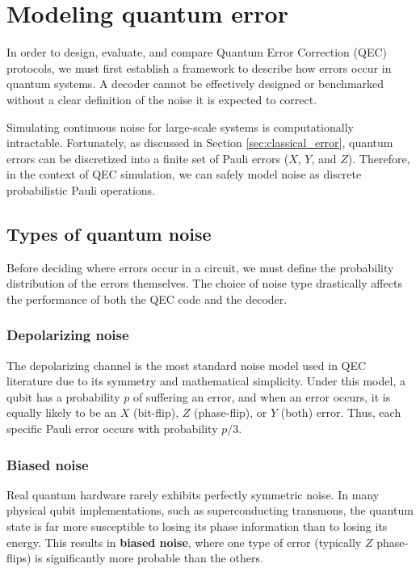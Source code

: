 \chapter{Modeling quantum error}
\label{chap:modeling_quantum_error}
In order to design, evaluate, and compare Quantum Error Correction (QEC) protocols, we must first establish a framework to describe how errors occur in quantum systems. A decoder cannot be effectively designed or benchmarked without a clear definition of the noise it is expected to correct. 

Simulating continuous noise for large-scale systems is computationally intractable. Fortunately, as discussed in Section \ref{sec:classical_error}, quantum errors can be discretized into a finite set of Pauli errors ($X$, $Y$, and $Z$). Therefore, in the context of QEC simulation, we can safely model noise as discrete probabilistic Pauli operations.

\section{Types of quantum noise}
\label{sec:types_of_noise}
Before deciding where errors occur in a circuit, we must define the probability distribution of the errors themselves. The choice of noise type drastically affects the performance of both the QEC code and the decoder.
\subsection{Depolarizing noise}
 The depolarizing channel is the most standard noise model used in QEC literature due to its symmetry and mathematical simplicity. Under this model, a qubit has a probability $p$ of suffering an error, and when an error occurs, it is equally likely to be an $X$ (bit-flip), $Z$ (phase-flip), or $Y$ (both) error. Thus, each specific Pauli error occurs with probability $p/3$.

\subsection{Biased noise}
Real quantum hardware rarely exhibits perfectly symmetric noise. In many physical qubit implementations, such as superconducting transmons, the quantum state is far more susceptible to losing its phase information than to losing its energy. This results in \textbf{biased noise}, where one type of error (typically $Z$ phase-flips) is significantly more probable than the others.

